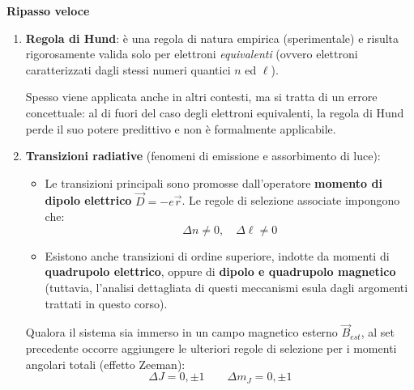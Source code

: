 \textbf{Ripasso veloce}

\begin{enumerate}
    \item \textbf{Regola di Hund}: è una regola di natura empirica (sperimentale) e risulta rigorosamente valida solo per elettroni \emph{equivalenti} (ovvero elettroni caratterizzati dagli stessi numeri quantici \(n\) ed \(\ell\)).
    
    \begin{attention}
        Spesso viene applicata anche in altri contesti, ma si tratta di un errore concettuale: al di fuori del caso degli elettroni equivalenti, la regola di Hund perde il suo potere predittivo e non è formalmente applicabile.
    \end{attention}

    \item \textbf{Transizioni radiative} (fenomeni di emissione e assorbimento di luce):
    \begin{itemize}
        \item Le transizioni principali sono promosse dall'operatore \textbf{momento di dipolo elettrico} \(\vec{D} = -e\vec{r}\). Le regole di selezione associate impongono che:
        \begin{equation*}
            \Delta n \neq 0, \quad \Delta \ell \neq 0
        \end{equation*}
        \item Esistono anche transizioni di ordine superiore, indotte da momenti di \textbf{quadrupolo elettrico}, oppure di \textbf{dipolo e quadrupolo magnetico} (tuttavia, l'analisi dettagliata di questi meccanismi esula dagli argomenti trattati in questo corso).
    \end{itemize}
    
    Qualora il sistema sia immerso in un campo magnetico esterno \(\vec{B}_{est}\), al set precedente occorre aggiungere le ulteriori regole di selezione per i momenti angolari totali (effetto Zeeman):
    \begin{equation*}
        \Delta J = 0, \pm 1 \qquad \Delta m_J = 0, \pm 1
    \end{equation*}
\end{enumerate}